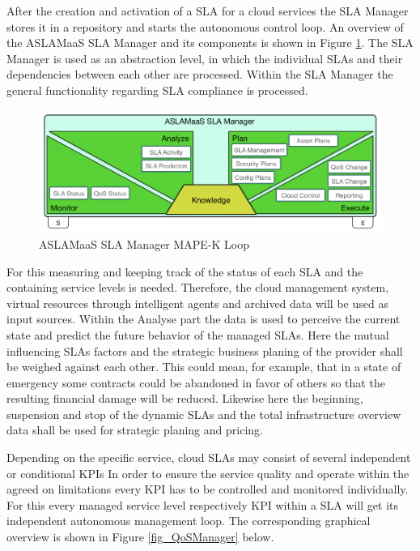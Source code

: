 After the creation and activation of a  SLA for a cloud services the SLA Manager stores it in a repository and starts the autonomous control loop. An overview of the ASLAMaaS SLA Manager and its components is shown in Figure \ref{fig_SLAManager}. The SLA Manager is used as an abstraction level, in which the individual SLAs and their dependencies between each other are processed. Within the SLA Manager the general functionality regarding SLA compliance is processed. 

\begin{figure}[!ht]
\centering
\includegraphics[width=5.3in]{chapters/chapter4/fig/SLAMan.PNG}
\caption{ASLAMaaS SLA Manager MAPE-K Loop }
\label{fig_SLAManager}
\end{figure}

For this measuring and keeping track of the status of each SLA and the containing service levels is needed. Therefore, the cloud management system,  virtual resources through intelligent agents and archived data will be used as input sources. Within the Analyse part the data is used to perceive the current state and predict the future behavior of the managed SLAs. Here the mutual influencing SLAs factors and the strategic business planing of the provider shall be weighed against each other. This could mean, for example, that in a state of emergency some contracts could be abandoned in favor of others so that the resulting financial damage will be reduced. Likewise here the beginning, suspension and stop of the dynamic SLAs and the total infrastructure overview data shall be used for strategic planing and pricing.  

Depending on the specific service, cloud SLAs may consist of several independent or conditional KPIs In order to ensure the service quality and operate within the agreed on limitations every KPI has to be controlled and monitored individually. For this every managed service level respectively KPI within a SLA will get its independent autonomous management loop. The corresponding graphical overview is shown in Figure \ref{fig_QoSManager} below.

